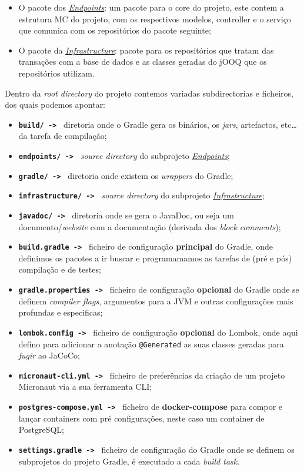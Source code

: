 \begin{itemize}
  \item O pacote dos \hyperref[endp]{\textit{Endpoints}}: um pacote para o core do projeto, este contem a estrutura MC do projeto, com os respectivos modelos, controller e o serviço que comunica com os repositórios do pacote seguinte;
  \item O pacote da \hyperref[infra]{\textit{Infrastructure}}: pacote para os repositórios que tratam das transações com a base de dados e as classes geradas do jOOQ que os repositórios utilizam.
\end{itemize}

Dentro da \textit{root directory} do projeto contemos variadas subdirectorias e ficheiros, dos quais podemos apontar:

\begin{itemize}
  \item \texttt{\textbf{build/ -> }} diretoria onde o Gradle gera os binários, os \textit{jars}, artefactos, etc\ldots da tarefa de compilação;
  \item \texttt{\textbf{endpoints/ -> }} \textit{source directory} do subprojeto \hyperref[endp]{\textit{Endpoints}};
  \item \texttt{\textbf{gradle/ -> }} diretoria onde existem os \textit{wrappers} do Gradle;
  \item \texttt{\textbf{infrastructure/ -> }} \textit{source directory} do subprojeto \hyperref[infra]{\textit{Infrastructure}};
  \item \texttt{\textbf{javadoc/ -> }} diretoria onde se gera o JavaDoc, ou seja um documento/\textit{website} com a documentação (derivada dos \textit{block comments});
  \item \texttt{\textbf{build.gradle -> }} ficheiro de configuração \textbf{principal} do Gradle, onde definimos os pacotes a ir buscar e programamamos as tarefas de (pré e pós) compilação e de testes;
  \item \texttt{\textbf{gradle.properties -> }} ficheiro de configuração \textbf{opcional} do Gradle onde se definem \textit{compiler flags}, argumentos para a JVM e outras configurações mais profundas e especificas;
  \item \texttt{\textbf{lombok.config -> }} ficheiro de configuração \textbf{opcional} do Lombok, onde aqui defino para adicionar a anotação \texttt{@Generated} as suas classes geradas para \textit{fugir} ao JaCoCo;
  \item \texttt{\textbf{micronaut-cli.yml -> }} ficheiro de preferências da criação de um projeto Micronaut via a sua ferramenta CLI;
  \item \texttt{\textbf{postgres-compose.yml -> }} ficheiro de \textbf{docker-compose} para compor e lançar containers com pré configurações, neste caso um container de PostgreSQL;
  \item \texttt{\textbf{settings.gradle -> }} ficheiro de configuração do Gradle onde se definem os subprojetos do projeto Gradle, é executado a cada \textit{build task}.
\end{itemize}

